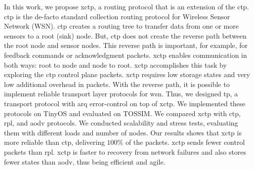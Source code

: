 In this work, we propose \ac{xctp}, a routing protocol that is an extension of the \ac{ctp}. \ac{ctp} is the de-facto standard collection routing protocol for Wireless Sensor Network (WSN). \ac{ctp} creates a routing tree to transfer data from one or more sensors to a root (sink) node. But, \ac{ctp} does not create the reverse path between the root node and sensor nodes. This reverse path is important, for example, for feedback commands or acknowledgment packets. \ac{xctp} enables communication in both ways: root to node and node to root. \ac{xctp} accomplishes this task by exploring the \ac{ctp} control plane packets. \ac{xctp} requires low storage states and very low additional overhead in packets.  With the reverse path, it is possible to implement reliable transport layer protocols for \ac{wsn}. Thus, we designed \ac{tp}, a transport protocol with \ac{arq} error-control on top of \ac{xctp}. We implemented these protocols on TinyOS and evaluated on TOSSIM. We compared \ac{xctp} with \ac{ctp}, \ac{rpl}, and \ac{aodv} protocols. We conducted scalability and stress tests, evaluating them with different loads and number of nodes. Our results shows that \ac{xctp} is more reliable than \ac{ctp}, delivering $100\%$ of the packets. \ac{xctp} sends fewer control packets than \ac{rpl}. \ac{xctp} is faster to recovery from network failures and also stores fewer states than \ac{aodv}, thus being efficient and agile.